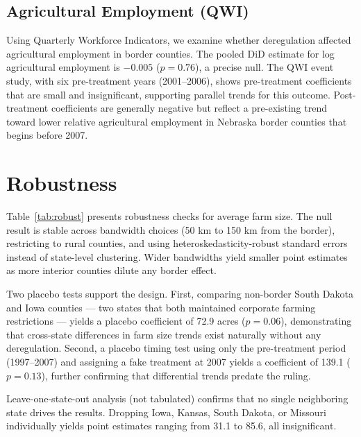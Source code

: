 \documentclass[12pt]{article}
\begin{document}


\subsection{Agricultural Employment (QWI)}

Using Quarterly Workforce Indicators, we examine whether deregulation affected agricultural employment in border counties. The pooled DiD estimate for log agricultural employment is $-0.005$ ($p = 0.76$), a precise null. The QWI event study, with six pre-treatment years (2001--2006), shows pre-treatment coefficients that are small and insignificant, supporting parallel trends for this outcome. Post-treatment coefficients are generally negative but reflect a pre-existing trend toward lower relative agricultural employment in Nebraska border counties that begins before 2007.

\label{apep_main_text_end}

\section{Robustness}\label{sec:robustness}

Table~\ref{tab:robust} presents robustness checks for average farm size. The null result is stable across bandwidth choices (50 km to 150 km from the border), restricting to rural counties, and using heteroskedasticity-robust standard errors instead of state-level clustering. Wider bandwidths yield smaller point estimates as more interior counties dilute any border effect.

Two placebo tests support the design. First, comparing non-border South Dakota and Iowa counties --- two states that both maintained corporate farming restrictions --- yields a placebo coefficient of 72.9 acres ($p = 0.06$), demonstrating that cross-state differences in farm size trends exist naturally without any deregulation. Second, a placebo timing test using only the pre-treatment period (1997--2007) and assigning a fake treatment at 2007 yields a coefficient of 139.1 ($p = 0.13$), further confirming that differential trends predate the ruling.

Leave-one-state-out analysis (not tabulated) confirms that no single neighboring state drives the results. Dropping Iowa, Kansas, South Dakota, or Missouri individually yields point estimates ranging from 31.1 to 85.6, all insignificant.
\end{document}
